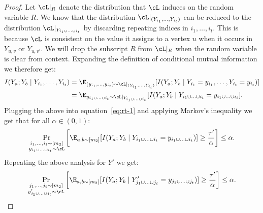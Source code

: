 \begin{proof}
Let $\cL|_R$ denote the distribution that $\cL$ induces on the random variable $R$. We know that the distribution $\cL|_{(Y_{i_1}, \ldots, Y_{i_t})}$ can be reduced to the distribution $\cL|_{Y_{i_1 \cup \ldots \cup i_t}}$ by discarding repeating indices in $i_1,\ldots,i_t$. This is because $\cL$ is consistent on the value it assigns to a vertex $u$ when it occurs in $Y_{u,v}$ or $Y_{u,v'}$. We will drop the subscript $R$ from $\cL|_R$ when the random variable is clear from context. Expanding the definition of conditional mutual information we therefore get:
\begin{align*}
I(Y_a;Y_b \mid Y_{i_1}, \ldots, Y_{i_t}) &= \E_{(y_{i_1}, \ldots,y_{i_t}) \sim \cL|_{(Y_{i_1}, \ldots, Y_{i_t})}}[I(Y_a ; Y_b \mid Y_{i_1} = y_{i_1}, \ldots,Y_{i_t} = y_{i_t})] \\
&= \E_{y_{i_1 \cup \ldots \cup i_t} \sim \cL|_{Y_{i_1 \cup \ldots \cup i_t}}}[I(Y_a ; Y_b \mid Y_{i_1 \cup \ldots \cup i_t} = y_{i_1 \cup \ldots \cup i_t}].
\end{align*}
Plugging the above into equation~\eqref{eq:rt-1} and applying Markov's inequality we get that for all $\alpha \in (0,1)$:
\begin{equation}\label{eq:avg1}
\Pr_{\substack{i_1,\ldots,i_t \sim [m_2] \\ y_{i_1 \cup \ldots \cup i_t} \sim \cL}}\left[\E_{a,b \sim [m_2]}[I(Y_a ; Y_b \mid Y_{i_1 \cup \ldots \cup i_t} = y_{i_1 \cup \ldots \cup i_t})] \geq \frac{\tau'}{\alpha} \right] \leq \alpha.
\end{equation}
Repeating the above analysis for $Y'$ we get:
\begin{equation}\label{eq:avg2}
\Pr_{\substack{j_1,\ldots,j_t \sim [m_2] \\ y'_{j_1 \cup \ldots \cup j_t} \sim \cL}}\left[\E_{a,b \sim [m_2]}[I(Y_a ; Y_b \mid Y'_{j_1 \cup \ldots \cup j_t} = y_{j_1 \cup \ldots \cup j_t})] \geq \frac{\tau'}{\alpha} \right] \leq \alpha.
\end{equation}


\end{proof}
